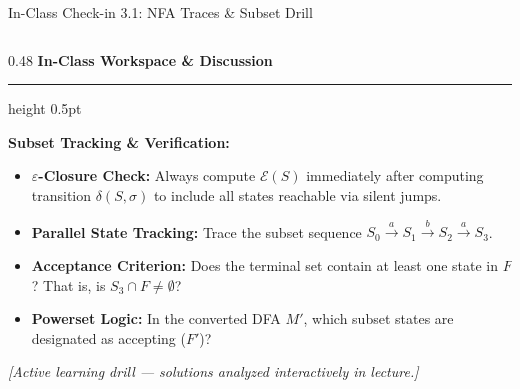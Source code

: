 \documentclass[aspectratio=169, 10pt]{beamer}
\newcommand{\colheader}[1]{%
  {\noindent\footnotesize\bfseries\color{gimpanavy}#1}%
  \vspace{0.02cm}%
  {\color{gimpanavy!30}\hrule height 0.5pt}%
  \vspace{0.05cm}%
}
\newcommand{\cardtitle}[1]{{\noindent\footnotesize\bfseries\color{gimpanavy}#1}\par\vspace{0.03cm}}
\begin{document}
\begin{frame}{In-Class Check-in 3.1: NFA Traces \& Subset Drill}
\begin{columns}[T]
    \begin{column}{0.48\textwidth}
      \colheader{In-Class Workspace \& Discussion}
      \begin{tcolorbox}[conceptcard]
        \cardtitle{Subset Tracking \& Verification:}
        \begin{itemize}\setlength{\itemsep}{3pt}\scriptsize
          \item \textbf{$\varepsilon$-Closure Check:} Always compute $\mathcal{E}(S)$ immediately after computing transition $\delta(S, \sigma)$ to include all states reachable via silent jumps.
          \item \textbf{Parallel State Tracking:} Trace the subset sequence $S_0 \xrightarrow{a} S_1 \xrightarrow{b} S_2 \xrightarrow{a} S_3$.
          \item \textbf{Acceptance Criterion:} Does the terminal set contain at least one state in $F$? That is, is $S_3 \cap F \ne \emptyset$?
          \item \textbf{Powerset Logic:} In the converted DFA $M'$, which subset states are designated as accepting ($F'$)?
        \end{itemize}
        \vspace{0.20cm}
        {\tiny\color{charcoalText}\textit{[Active learning drill --- solutions analyzed interactively in lecture.]}}
      \end{tcolorbox}
    \end{column}
  \end{columns}
\end{frame}
\end{document}
